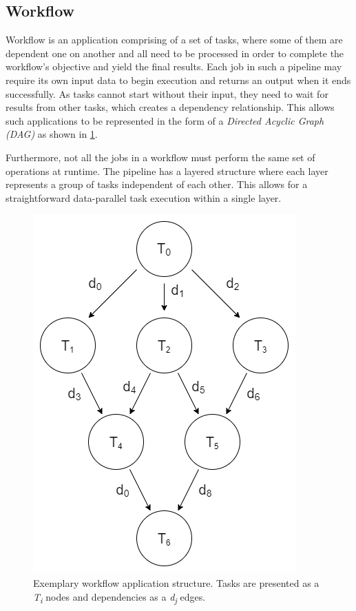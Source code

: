 \subsection{Workflow}
\label{s:ProblemDomain:Workflow}

Workflow is an application comprising of a set of tasks, where some of them are dependent one on another and all need to be processed in order to complete the workflow's objective and yield the final results.
Each job in such a pipeline may require its own input data to begin execution and returns an output when it ends successfully.
As tasks cannot start without their input, they need to wait for results from other tasks, which creates a dependency relationship.
This allows such applications to be represented in the form of a \emph{Directed Acyclic Graph (DAG)} as shown in \cref{fig:workflow:dag-example}.

Furthermore, not all the jobs in a workflow must perform the same set of operations at runtime.
The pipeline has a layered structure where each layer represents a group of tasks independent of each other.
This allows for a straightforward data-parallel task execution within a single layer. 


\begin{figure}[H]
\centering
\includegraphics[width=0.3\linewidth]{figures/2-3-dag-example-with-d.png}
\caption[Exemplary workflow application structure]{Exemplary workflow application structure. Tasks are presented as a \emph{T\textsubscript{i}} nodes and dependencies as a \emph{d\textsubscript{j}} edges.}
\label{fig:workflow:dag-example}


\end{figure}


